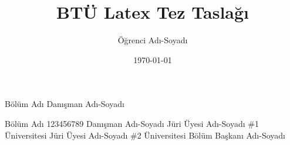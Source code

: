 \documentclass{btutez}
\title{BTÜ Latex Tez Taslağı}
\author{Öğrenci Adı-Soyadı}
\date{\today}
\begin{document}
	\startthesis

	\innercoverpage
		{Bölüm Adı}
		{Danışman Adı-Soyadı}

	\declaration
		{Bölüm Adı}
		{123456789}
		{Danışman Adı-Soyadı}
		{Jüri Üyesi Adı-Soyadı \#1}
		{Üniversitesi}
		{Jüri Üyesi Adı-Soyadı \#2}
		{Üniversitesi}
		{Bölüm Başkanı Adı-Soyadı}

	\startcontent
\end{document}
